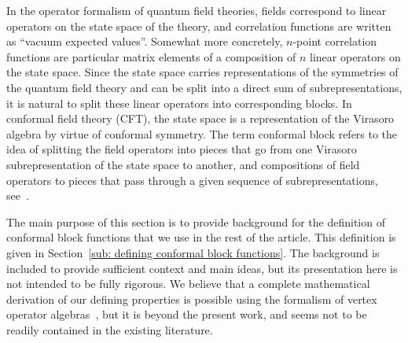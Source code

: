 \documentclass[oneside,english]{amsart}
\numberwithin{equation}{section}
\numberwithin{figure}{section}
\theoremstyle{plain}
\theoremstyle{plain}
\theoremstyle{plain}
\theoremstyle{remark}
\theoremstyle{plain}
\theoremstyle{plain}
\theoremstyle{plain}
\theoremstyle{plain}
\theoremstyle{plain}
\theoremstyle{plain}
\theoremstyle{plain}
\theoremstyle{plain}
\newcommand{\alexmod}[1]{{\color{allucol} #1}}
\newcommand{\blue}[1]{{\color{blue} #1}}
\begin{document}
In the operator formalism of quantum field theories, fields correspond
to linear operators on the state space of the theory, and correlation
functions are written as ``vacuum expected values''. Somewhat more
concretely, $n$-point correlation functions are particular matrix
elements of a composition of $n$ linear operators on the state space.
Since the state space carries representations of the symmetries of the quantum field theory and
can be split into a direct sum of subrepresentations, %
it is natural to split these linear operators into corresponding blocks. 
In conformal field theory (CFT), %
the state space is a representation of the Virasoro algebra by virtue of conformal symmetry. 
The term conformal block 
refers to the idea of splitting the field operators into pieces
that go from one Virasoro subrepresentation of the state space to another, and compositions of field operators to
pieces that pass through a given sequence of %
subrepresentations, see~\cite{BPZ-infinite_conformal_symmetry_in_2D_QFT, Felder-BRST_approach,
DMS-CFT, Ribault-conformal_field_theory_on_the_plane}.

The main purpose of this section is to provide background for the definition of conformal block functions
that we use in the rest of the article. 
This definition is given in
Section~\ref{sub: defining conformal block functions}.
The background is included 
to provide sufficient context and main ideas, but its
presentation here is not intended to be fully rigorous.
We believe that a complete mathematical derivation of our defining properties 
is possible using the formalism of vertex operator
algebras~\cite{Lepowsky_Li-VOA}, but it is beyond the present work, and 
seems not to be readily contained in the existing literature. 


\end{document}
